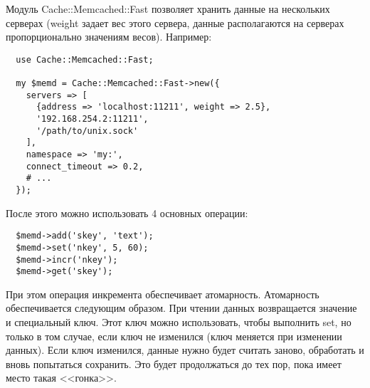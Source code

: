Модуль Cache::Memcached::Fast позволяет хранить данные на нескольких серверах (weight задает вес этого сервера, данные располагаются на серверах пропорционально значениям весов). Например:
\begin{verbatim}
  use Cache::Memcached::Fast;

  my $memd = Cache::Memcached::Fast->new({
    servers => [
      {address => 'localhost:11211', weight => 2.5},
      '192.168.254.2:11211',
      '/path/to/unix.sock'
    ],
    namespace => 'my:',
    connect_timeout => 0.2,
    # ...
  });
\end{verbatim}
После этого можно использовать 4 основных операции:
\begin{verbatim}
  $memd->add('skey', 'text');
  $memd->set('nkey', 5, 60);
  $memd->incr('nkey');
  $memd->get('skey');
\end{verbatim}
При этом операция инкремента обеспечивает атомарность. Атомарность обеспечивается следующим образом. При чтении данных возвращается значение и специальный ключ. Этот ключ можно использовать, чтобы выполнить set, но только в том случае, если ключ не изменился (ключ меняется при изменении данных). Если ключ изменился, данные нужно будет считать заново, обработать и вновь попытаться сохранить. Это будет продолжаться до тех пор, пока имеет место такая <<гонка>>.
